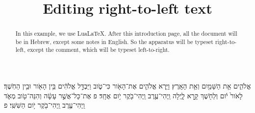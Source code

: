 \documentclass{article}
\title{Editing right-to-left text}
\date{}
\begin{document}
\maketitle
\begin{abstract}
  In this example, we use Lua\LaTeX.
  After this introduction page, all the document will be in Hebrew, except some notes in English.
  So the apparatus will be typeset right-to-left, except the comment, which will be typeset left-to-right.
\end{abstract}


\newpage
{}

\beginnumbering


\pstart
{}
אֱלֹהִ֑ים אֵ֥ת הַשָּׁמַ֖יִם וְאֵ֥ת הָאָֽרֶץ׃
וַיַּ֧רְא אֱלֹהִ֛ים אֶת־הָאֹ֖ור כִּי־טֹ֑וב וַיַּבְדֵּ֣ל אֱלֹהִ֔ים בֵּ֥ין הָאֹ֖ור וּבֵ֥ין הַחֹֽשֶׁךְ׃
 לָאֹור֙ יֹ֔ום וְלַחֹ֖שֶׁךְ קָ֣רָא לָ֑יְלָה וַֽיְהִי־עֶ֥רֶב וַֽיְהִי־בֹ֖קֶר יֹ֥ום אֶחָֽד׃ פ
 אֶת־כָּל־אֲשֶׁ֣ר עָשָׂ֔ה וְהִנֵּה־טֹ֖וב מְאֹ֑ד וַֽיְהִי־עֶ֥רֶב וַֽיְהִי־בֹ֖קֶר יֹ֥ום הַשִּׁשִּֽׁי׃ פ

\pend
\endnumbering
\end{document}
